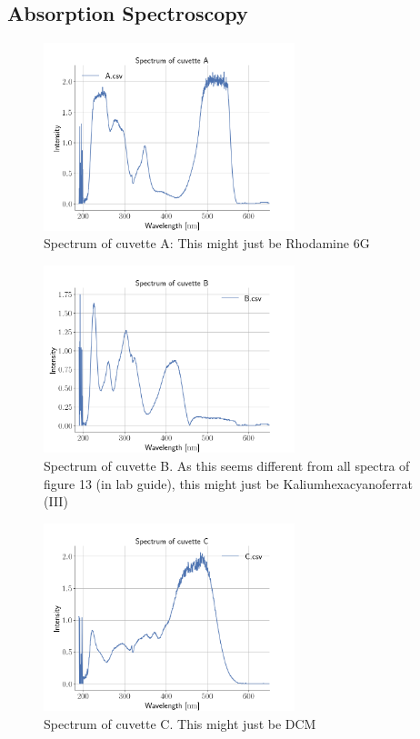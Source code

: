 \subsection{Absorption Spectroscopy}
\begin{figure}[h]
\centering
\includegraphics[width=0.65\textwidth]{absA}
\caption{Spectrum of cuvette A: This might just be Rhodamine 6G}
\label{fig:absA}
\end{figure}
\begin{figure}[h]
\centering
\includegraphics[width=0.65\textwidth]{absB}
\caption{Spectrum of cuvette B. As this seems different from all spectra of
figure 13 (in lab guide), this might just be Kaliumhexacyanoferrat (III)}
\label{fig:absB}
\end{figure}
\begin{figure}[h]
\centering
\includegraphics[width=0.65\textwidth]{absC}
\caption{Spectrum of cuvette C. This might just be DCM}
\label{fig:absC}
\end{figure}
